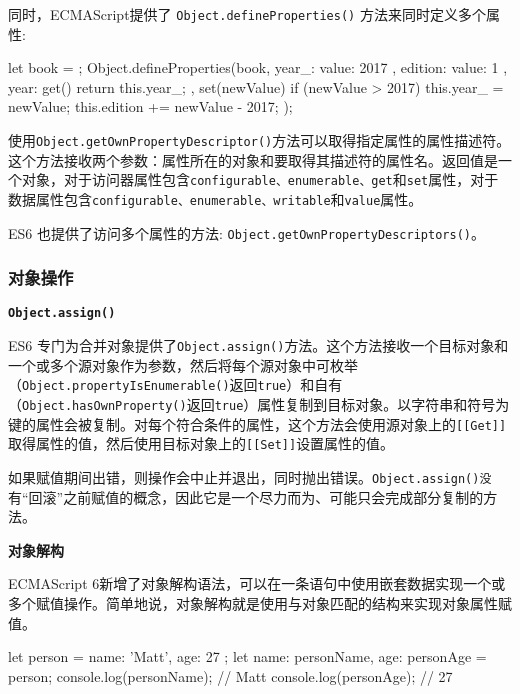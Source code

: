 同时，ECMAScript提供了 \texttt{Object.defineProperties()} 方法来同时定义多个属性:

\begin{JavaScript}
let book = {};  
Object.defineProperties(book, {   
    year_: {     
        value: 2017   
    },   
    edition: {     
        value: 1   
    },   
    year: {     
        get() {       
            return this.year_;     
        }, 
        set(newValue) {       
            if (newValue > 2017) {         
                this.year_ = newValue;         
                this.edition += newValue - 2017;       
            }     
        }   
    } 
}); 
\end{JavaScript}

使用\texttt{Object.getOwnPropertyDescriptor()}方法可以取得指定属性的属性描述符。这个方法接收两个参数：属性所在的对象和要取得其描述符的属性名。返回值是一个对象，对于访问器属性包含\texttt{configurable、enumerable、get}和\texttt{set}属性，对于数据属性包含\texttt{configurable、enumerable、writable}和\texttt{value}属性。

ES6 也提供了访问多个属性的方法: \texttt{Object.getOwnPropertyDescriptors()}。

\subsubsection{对象操作}

\noindent\textbf{\texttt{Object.assign()}}

ES6 专门为合并对象提供了\texttt{Object.assign()}方法。这个方法接收一个目标对象和一个或多个源对象作为参数，然后将每个源对象中可枚举（\texttt{Object.propertyIsEnumerable()}返回\texttt{true}）和自有（\texttt{Object.hasOwnProperty()}返回\texttt{true}）属性复制到目标对象。以字符串和符号为键的属性会被复制。对每个符合条件的属性，这个方法会使用源对象上的\texttt{[[Get]]}取得属性的值，然后使用目标对象上的\texttt{[[Set]]}设置属性的值。

如果赋值期间出错，则操作会中止并退出，同时抛出错误。\texttt{Object.assign()没}有“回滚”之前赋值的概念，因此它是一个尽力而为、可能只会完成部分复制的方法。

\noindent\textbf{对象解构}

ECMAScript 6新增了对象解构语法，可以在一条语句中使用嵌套数据实现一个或多个赋值操作。简单地说，对象解构就是使用与对象匹配的结构来实现对象属性赋值。

\begin{JavaScript}
let person = {   
    name: 'Matt',   
    age: 27 
}; 
let { name: personName, age: personAge } = person; 
console.log(personName);  // Matt 
console.log(personAge);   // 27 
\end{JavaScript}

